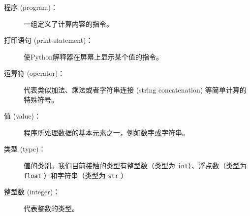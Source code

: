 \begin{description}

\item[程序 (program)：] 一组定义了计算内容的指令。
  


\item[打印语句 (print statement)：]  使Python解释器在屏幕上显示某个值的指令。
  
  


\item[运算符 (operator)：]  代表类似加法、乘法或者字符串连接 (string concatenation) 等简单计算的特殊符号。
  


\item[值 (value)：]  程序所处理数据的基本元素之一，例如数字或字符串。
  


\item[类型 (type)：] 值的类别。我们目前接触的类型有整型数（类型为 \lstinline{int}）、浮点数（类型为 \lstinline{float} ）和字符串（类型为 \lstinline{str} ）
  


\item[整型数 (integer)：] 代表整数的类型。
  



\end{description}

